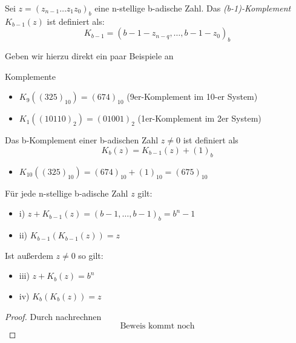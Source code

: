 \begin{definition}[(b-1)-Komplement]
Sei $z=(z_{n-1}\ldots z_1 z_0)_b$ eine n-stellige b-adische Zahl. Das \emph{(b-1)-Komplement} $K_{b-1}(z)$ ist definiert als:
\[
K_{b-1} = (b-1-z_{n-q},\ldots, b-1-z_0)_b
\]
\end{definition}
Geben wir hierzu direkt ein paar Beispiele an
\begin{example} Komplemente \\
\begin{itemize}
	\item $K_9((325)_{10})= (674)_{10}$  (9er-Komplement im 10-er System)
	\item $K_1((10110)_2)=(01001)_2$ (1er-Komplement im 2er System)
\end{itemize}
\end{example}
\begin{definition}[b-Komplement]
Das b-Komplement einer b-adischen Zahl $z\neq 0$ ist definiert als \[
K_b(z)=K_{b-1}(z) +(1)_b
\]
\end{definition}
\begin{example}
\begin{itemize}
	\item $K_{10}((325)_{10}) = (674)_{10} + (1)_{10} = (675)_{10}$
\end{itemize}
\end{example}
\begin{lemma}[]
Für jede n-stellige b-adische Zahl $z$ gilt:
\begin{itemize}
	
	\item i) $z+K_{b-1}(z)=(b-1,\ldots,b-1)_b = b^{n}-1$
	\item ii) $K_{b-1}\left( K_{b-1}(z) \right)=z$
\end{itemize}
Ist außerdem $z\neq 0$ so gilt:
\begin{itemize}
	
	\item iii) $z+K_b(z)=b^{n}$
	\item iv) $K_b(K_b(z))=z$
\end{itemize}
\end{lemma}
\begin{proof}
Durch nachrechnen
\[
\text{Beweis kommt noch}
\]
\end{proof}

